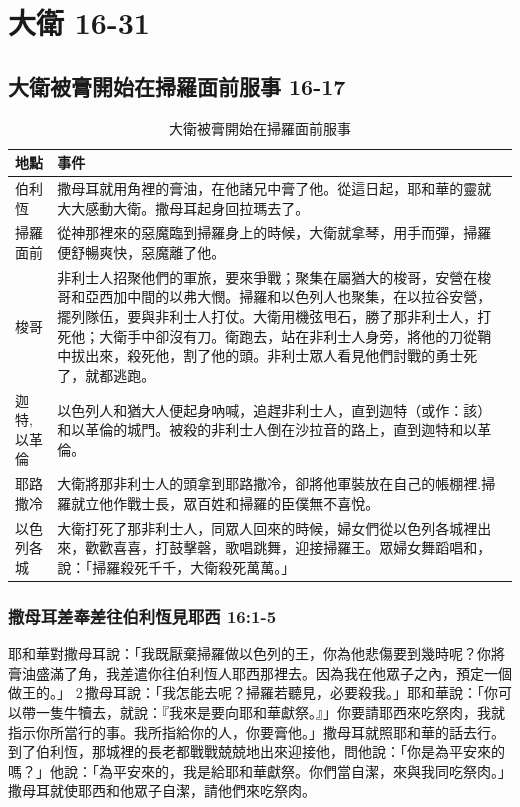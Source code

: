 \section{大衛 16-31}
\subsection{大衛被膏開始在掃羅面前服事 16-17}

\begin{table}[!hbp]
\centering 
\begin{tabular}{|p{2cm}|p{16cm}|}
\hline
\hline
地點 & 事件\\\hline\hline
伯利恆 &撒母耳就用角裡的膏油，在他諸兄中膏了他。從這日起，耶和華的靈就大大感動大衛。撒母耳起身回拉瑪去了。  \\\hline
掃羅面前&從神那裡來的惡魔臨到掃羅身上的時候，大衛就拿琴，用手而彈，掃羅便舒暢爽快，惡魔離了他。 \\\hline
梭哥& 非利士人招聚他們的軍旅，要來爭戰；聚集在屬猶大的梭哥，安營在梭哥和亞西加中間的以弗大憫。掃羅和以色列人也聚集，在以拉谷安營，擺列隊伍，要與非利士人打仗。大衛用機弦甩石，勝了那非利士人，打死他；大衛手中卻沒有刀。衛跑去，站在非利士人身旁，將他的刀從鞘中拔出來，殺死他，割了他的頭。非利士眾人看見他們討戰的勇士死了，就都逃跑。 \\\hline
迦特,以革倫&以色列人和猶大人便起身吶喊，追趕非利士人，直到迦特（或作：該）和以革倫的城門。被殺的非利士人倒在沙拉音的路上，直到迦特和以革倫。 \\\hline
耶路撒冷&大衛將那非利士人的頭拿到耶路撒冷，卻將他軍裝放在自己的帳棚裡.掃羅就立他作戰士長，眾百姓和掃羅的臣僕無不喜悅。\\\hline
以色列各城&大衛打死了那非利士人，同眾人回來的時候，婦女們從以色列各城裡出來，歡歡喜喜，打鼓擊磬，歌唱跳舞，迎接掃羅王。眾婦女舞蹈唱和，說：「掃羅殺死千千，大衛殺死萬萬。」\\\hline
\end{tabular}
\caption{大衛被膏開始在掃羅面前服事}
\end{table}

\subsubsection{撒母耳差奉差往伯利恆見耶西 16:1-5}
耶和華對撒母耳說：「我既厭棄掃羅做以色列的王，你為他悲傷要到幾時呢？你將膏油盛滿了角，我差遣你往伯利恆人耶西那裡去。因為我在他眾子之內，預定一個做王的。」 2 撒母耳說：「我怎能去呢？掃羅若聽見，必要殺我。」耶和華說：「你可以帶一隻牛犢去，就說：『我來是要向耶和華獻祭。』」你要請耶西來吃祭肉，我就指示你所當行的事。我所指給你的人，你要膏他。」撒母耳就照耶和華的話去行。到了伯利恆，那城裡的長老都戰戰兢兢地出來迎接他，問他說：「你是為平安來的嗎？」他說：「為平安來的，我是給耶和華獻祭。你們當自潔，來與我同吃祭肉。」撒母耳就使耶西和他眾子自潔，請他們來吃祭肉。

